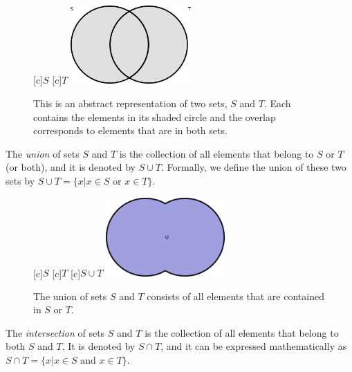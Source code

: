 \begin{figure}[htb!]
\begin{center}
\begin{psfrags}
[c]{$S$}
[c]{$T$}
\includegraphics[height=3.00cm]{Figures/1Chapter/sets}
\end{psfrags}
\caption{This is an abstract representation of two sets, $S$ and $T$.
Each contains the elements in its shaded circle and the overlap corresponds to elements that are in both sets.}
\end{center}
\end{figure}

The \emph{union} of sets $S$ and $T$ is the collection of all elements that belong to $S$ or $T$ (or both), and it is denoted by $S \cup T$.
Formally, we define the union of these two sets by $S \cup T = \{ x | x \in S \text{ or } x \in T \}$.

\begin{figure}[htb!]
\begin{center}
\begin{psfrags}
[c]{$S$}
[c]{$T$}
[c]{$S \cup T$}
\includegraphics[height=3.03cm]{Figures/1Chapter/union}
\end{psfrags}
\caption{The union of sets $S$ and $T$ consists of all elements that are contained in $S$ or $T$.}
\end{center}
\end{figure}

The \emph{intersection} of sets $S$ and $T$ is the collection of all elements that belong to both $S$ and $T$.
It is denoted by $S \cap T$, and it can be expressed mathematically as $S \cap T = \{ x | x \in S \text{ and } x \in T \}$.

